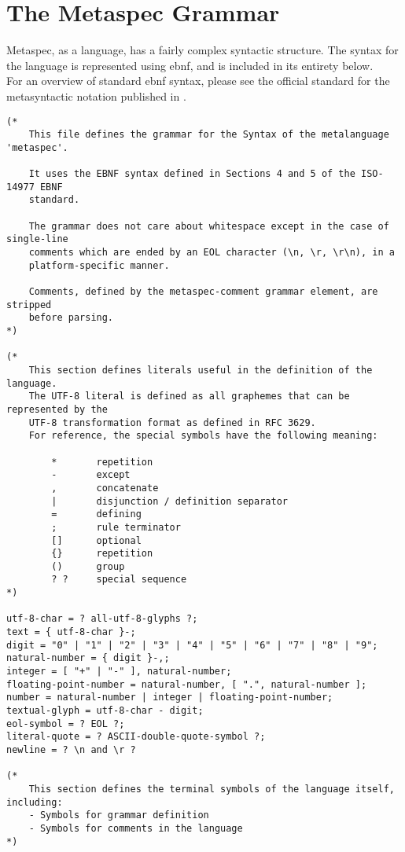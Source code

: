\chapter{The Metaspec Grammar} %
\label{cha:the_metaspec_grammar}
Metaspec, as a language, has a fairly complex syntactic structure. 
The syntax for the language is represented using \gls{ebnf}, and is included in its entirety below. \\

For an overview of standard \gls{ebnf} syntax, please see the official standard for the metasyntactic notation published in \citet{standard1996ebnf}.

\begin{lstlisting}
(*
    This file defines the grammar for the Syntax of the metalanguage 'metaspec'.

    It uses the EBNF syntax defined in Sections 4 and 5 of the ISO-14977 EBNF
    standard.

    The grammar does not care about whitespace except in the case of single-line
    comments which are ended by an EOL character (\n, \r, \r\n), in a
    platform-specific manner.

    Comments, defined by the metaspec-comment grammar element, are stripped 
    before parsing.
*)

(*
    This section defines literals useful in the definition of the language.
    The UTF-8 literal is defined as all graphemes that can be represented by the
    UTF-8 transformation format as defined in RFC 3629.
    For reference, the special symbols have the following meaning:

        *       repetition
        -       except
        ,       concatenate
        |       disjunction / definition separator
        =       defining
        ;       rule terminator
        []      optional
        {}      repetition
        ()      group
        ? ?     special sequence
*)

utf-8-char = ? all-utf-8-glyphs ?;
text = { utf-8-char }-;
digit = "0" | "1" | "2" | "3" | "4" | "5" | "6" | "7" | "8" | "9";
natural-number = { digit }-,;
integer = [ "+" | "-" ], natural-number;
floating-point-number = natural-number, [ ".", natural-number ];
number = natural-number | integer | floating-point-number;
textual-glyph = utf-8-char - digit;
eol-symbol = ? EOL ?;
literal-quote = ? ASCII-double-quote-symbol ?;
newline = ? \n and \r ?

(*
    This section defines the terminal symbols of the language itself, including:
    - Symbols for grammar definition
    - Symbols for comments in the language
*)


\end{lstlisting}
